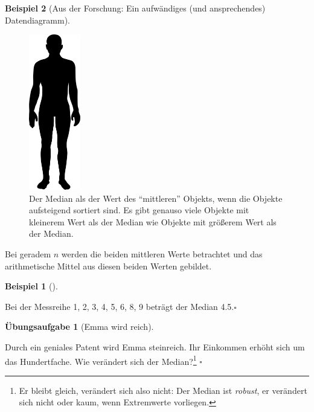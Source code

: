 \documentclass[
  a4paper,
]{scrbook}
\theoremstyle{definition}
\newtheorem{example}{Beispiel}[chapter]
\theoremstyle{definition}
\theoremstyle{definition}
\newtheorem{exercise}{Übungsaufgabe}[chapter]
\theoremstyle{remark}
\begin{document}
\begin{example}[Aus der Forschung: Ein aufwändiges (und ansprechendes)
Datendiagramm]
\begin{figure}
\begin{minipage}{0.20\linewidth}
\end{minipage}%
%
\begin{minipage}{0.20\linewidth}

\includegraphics[width=0.2\textwidth,height=\textheight]{img/Human_Silhouette.svg.png}

\end{minipage}%

\caption{\label{fig-median-human}Der Median als der Wert des
``mittleren'' Objekts, wenn die Objekte aufsteigend sortiert sind. Es
gibt genauso viele Objekte mit kleinerem Wert als der Median wie Objekte
mit größerem Wert als der Median.}

\end{figure}%

Bei geradem \(n\) werden die beiden mittleren Werte betrachtet und das
arithmetische Mittel aus diesen beiden Werten gebildet.

\begin{example}[]\protect\hypertarget{exm-med2}{}\label{exm-med2}

Bei der Messreihe 1, 2, 3, 4, 5, 6, 8, 9 beträgt der Median
4.5.\(\square\)

\end{example}

\begin{exercise}[Emma wird
reich]\protect\hypertarget{exr-md2}{}\label{exr-md2}

Durch ein geniales Patent wird Emma steinreich. Ihr Einkommen erhöht
sich um das Hundertfache. Wie verändert sich der Median?\footnote{Er
  bleibt gleich, verändert sich also nicht: Der Median ist
  \emph{robust}, er verändert sich nicht oder kaum, wenn Extremwerte
  vorliegen.} \(\square\)


\end{exercise}
\end{example}
\end{document}
